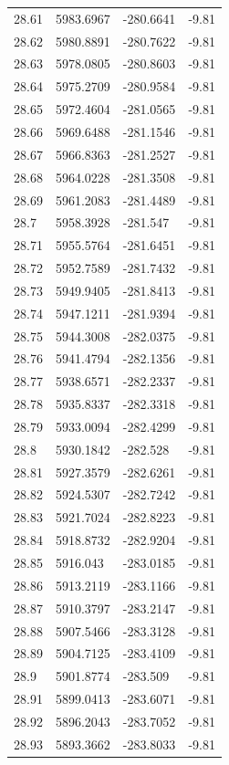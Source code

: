 \begin{table}[H]
\begin{tabular}{llll}
28.61 & 5983.6967 & -280.6641 & -9.81 \\
28.62 & 5980.8891 & -280.7622 & -9.81 \\
28.63 & 5978.0805 & -280.8603 & -9.81 \\
28.64 & 5975.2709 & -280.9584 & -9.81 \\
28.65 & 5972.4604 & -281.0565 & -9.81 \\
28.66 & 5969.6488 & -281.1546 & -9.81 \\
28.67 & 5966.8363 & -281.2527 & -9.81 \\
28.68 & 5964.0228 & -281.3508 & -9.81 \\
28.69 & 5961.2083 & -281.4489 & -9.81 \\
28.7 & 5958.3928 & -281.547 & -9.81 \\
28.71 & 5955.5764 & -281.6451 & -9.81 \\
28.72 & 5952.7589 & -281.7432 & -9.81 \\
28.73 & 5949.9405 & -281.8413 & -9.81 \\
28.74 & 5947.1211 & -281.9394 & -9.81 \\
28.75 & 5944.3008 & -282.0375 & -9.81 \\
28.76 & 5941.4794 & -282.1356 & -9.81 \\
28.77 & 5938.6571 & -282.2337 & -9.81 \\
28.78 & 5935.8337 & -282.3318 & -9.81 \\
28.79 & 5933.0094 & -282.4299 & -9.81 \\
28.8 & 5930.1842 & -282.528 & -9.81 \\
28.81 & 5927.3579 & -282.6261 & -9.81 \\
28.82 & 5924.5307 & -282.7242 & -9.81 \\
28.83 & 5921.7024 & -282.8223 & -9.81 \\
28.84 & 5918.8732 & -282.9204 & -9.81 \\
28.85 & 5916.043 & -283.0185 & -9.81 \\
28.86 & 5913.2119 & -283.1166 & -9.81 \\
28.87 & 5910.3797 & -283.2147 & -9.81 \\
28.88 & 5907.5466 & -283.3128 & -9.81 \\
28.89 & 5904.7125 & -283.4109 & -9.81 \\
28.9 & 5901.8774 & -283.509 & -9.81 \\
28.91 & 5899.0413 & -283.6071 & -9.81 \\
28.92 & 5896.2043 & -283.7052 & -9.81 \\
28.93 & 5893.3662 & -283.8033 & -9.81 \\

\end{tabular}
\end{table}
